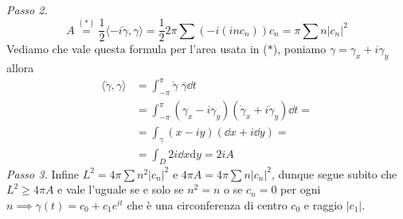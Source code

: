 \textit{Passo 2.}
$$
A \overset{(*)}{=} \frac{1}{2}\langle -i\dot\gamma, \gamma \rangle = \frac{1}{2} 2\pi \sum (-i (inc_n))c_n = \pi \sum n |c_n|^2
$$
Vediamo che vale questa formula per l'area usata in ($*$), poniamo $\gamma = \gamma_x + i \gamma_y$ allora
$$
\begin{aligned}
	\langle \dot\gamma, \gamma \rangle 
	&= \int_{-\pi}^\pi \dot\gamma \; \overline\gamma \dd t \\
	&= \int_{-\pi}^\pi (\gamma_x - i \gamma_y) (\dot\gamma_x + i \dot\gamma_y) \dd t = \\
	&= \int_\gamma (x - iy) (\dd x + i \dd y) = \\
	&= \int_D 2i \dd x \mathrm d y = 2i A
\end{aligned}
$$
\textit{Passo 3.}
Infine $L^2 = 4 \pi \sum n^2 |c_n|^2$ e $4\pi A = 4\pi \sum n |c_n|^2$, dunque segue subito che $L^2 \geq 4 \pi A$ e vale l'uguale se e solo se $n^2 = n$ o se $c_n = 0$ per ogni $n \implies \gamma(t) = c_0 + c_1 e^{it}$ che è una circonferenza di centro $c_0$ e raggio $|c_1|$.




